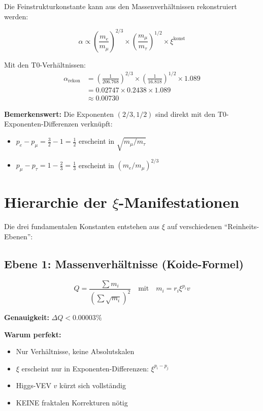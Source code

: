	\begin{beweis}
		Die Feinstrukturkonstante kann aus den Massenverhältnissen rekonstruiert werden:
		
		\begin{equation}
			\alpha \propto \left(\frac{m_e}{m_\mu}\right)^{2/3} \times \left(\frac{m_\mu}{m_\tau}\right)^{1/2} \times \xi^{\text{konst}}
		\end{equation}
		
		Mit den T0-Verhältnissen:
		\begin{align}
			\alpha_{\text{rekon}} &= \left(\frac{1}{206.768}\right)^{2/3} \times \left(\frac{1}{16.818}\right)^{1/2} \times 1.089 \\
			&= 0.02747 \times 0.2438 \times 1.089 \\
			&\approx 0.00730
		\end{align}
	\end{beweis}
	
	\textbf{Bemerkenswert:} Die Exponenten $(2/3, 1/2)$ sind direkt mit den T0-Exponenten-Differenzen verknüpft:
	\begin{itemize}
		\item $p_e - p_\mu = \frac{3}{2} - 1 = \frac{1}{2}$ erscheint in $\sqrt{m_\mu/m_\tau}$
		\item $p_\mu - p_\tau = 1 - \frac{2}{3} = \frac{1}{3}$ erscheint in $(m_e/m_\mu)^{2/3}$
	\end{itemize}
	
	\section{Hierarchie der $\xi$-Manifestationen}
	
	Die drei fundamentalen Konstanten entstehen aus $\xi$ auf verschiedenen ``Reinheits-Ebenen'':
	
	\subsection{Ebene 1: Massenverhältnisse (Koide-Formel)}
	
	\begin{equation}
		Q = \frac{\sum m_i}{\left(\sum \sqrt{m_i}\right)^2} \quad \text{mit} \quad m_i = r_i \xi^{p_i} v
	\end{equation}
	
	\begin{tcolorbox}[colback=green!5!white,colframe=green!75!black,title=Reinste $\xi$-Form]
		\textbf{Genauigkeit:} $\Delta Q < 0.00003\%$
		
		\textbf{Warum perfekt:}
		\begin{itemize}
			\item Nur Verhältnisse, keine Absolutskalen
			\item $\xi$ erscheint nur in Exponenten-Differenzen: $\xi^{p_i - p_j}$
			\item Higgs-VEV $v$ kürzt sich vollständig
			\item KEINE fraktalen Korrekturen nötig
		\end{itemize}
	\end{tcolorbox}
	
